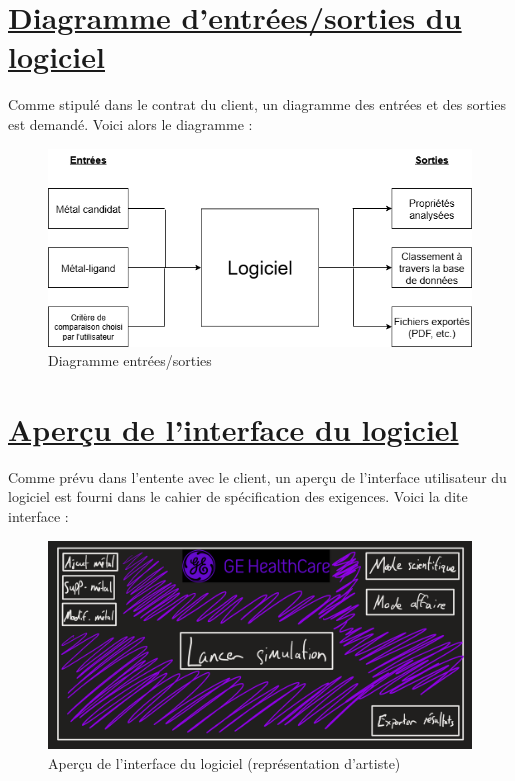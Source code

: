 \documentclass[11pt]{article}
\begin{document}
\section{\underline{Diagramme d'entrées/sorties du logiciel}}
Comme stipulé dans le contrat du client, un diagramme des entrées et des sorties est demandé. Voici alors le diagramme :

\begin{figure}[h!]
  \includegraphics[width=\linewidth]{diagramme.png}
  \caption{Diagramme entrées/sorties}
\end{figure}
\pagebreak


\section{\underline{Aperçu de l'interface du logiciel}}
Comme prévu dans l'entente avec le client, un aperçu de l'interface utilisateur du logiciel est fourni dans le cahier de spécification des exigences. Voici la dite interface :

\begin{figure}[h!]
  \includegraphics[width=\linewidth]{interface.png}
  \caption{Aperçu de l'interface du logiciel (représentation d'artiste)}
\end{figure}
\end{document}
